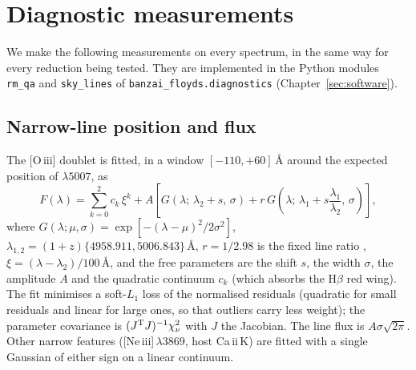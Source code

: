 \chapter{Diagnostic measurements}
\label{sec:diagnostics}

We make the following measurements on every spectrum, in the same way for every reduction being tested. They are
implemented in the Python modules \texttt{rm\_qa} and \texttt{sky\_lines} of \texttt{banzai\_floyds.diagnostics}
(Chapter~\ref{sec:software}).

\section{Narrow-line position and flux}
\label{sec:diag_narrow}
The [O\,{\sc iii}] doublet is fitted, in a window $[-110,+60]$\,\AA{} around the expected position of
$\lambda5007$, as
\begin{equation}
F(\lambda) = \sum_{k=0}^{2} c_k\,\xi^k + A\left[ G(\lambda;\,\lambda_{2}+s,\,\sigma)
 + r\,G\!\left(\lambda;\,\lambda_{1}+s\frac{\lambda_1}{\lambda_2},\,\sigma\right)\right],
\label{eq:o3}
\end{equation}
where $G(\lambda;\mu,\sigma)=\exp[-(\lambda-\mu)^2/2\sigma^2]$, $\lambda_{1,2}=(1+z)\{4958.911,5006.843\}$\,\AA,
$r=1/2.98$ is the fixed line ratio \citep{Storey2000}, $\xi=(\lambda-\lambda_2)/100$\,\AA, and the free parameters are
the shift $s$, the width $\sigma$, the amplitude $A$ and the quadratic continuum $c_k$ (which absorbs the
H$\beta$ red wing). The fit minimises a soft-$L_1$ loss of the normalised residuals (quadratic for small residuals and linear for large
ones, so that outliers carry less weight); the parameter covariance is
$(J^{\rm T}J)^{-1}\chi^2_\nu$ with $J$ the Jacobian. The line flux is $A\sigma\sqrt{2\pi}$. Other narrow features
([Ne\,{\sc iii}]\,$\lambda3869$, host Ca\,{\sc ii}\,K) are fitted with a single Gaussian of either sign on a linear
continuum.

